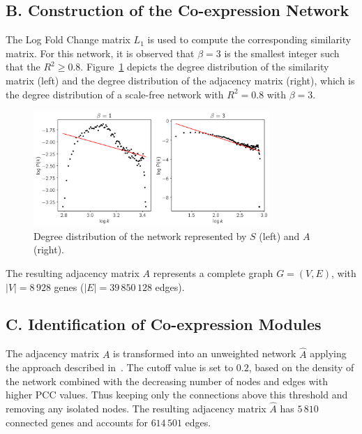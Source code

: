 \subsection*{B. Construction of the Co-expression Network}

The Log Fold Change matrix $L_1$ is used to compute the corresponding
similarity matrix.  For this network, it is observed that $\beta=3$ is
the smallest integer such that the $R^2 \geq 0.8
$. Figure~\ref{fig:beta} depicts the degree distribution of the
similarity matrix (left) and the degree distribution of the adjacency
matrix (right), which is the degree distribution of a scale-free
network with $R^2 = 0.8$ with $\beta = 3$.
\vspace{0.5cm}

\begin{figure}[htbp]
  \centering
    \includegraphics[clip,width=0.8\textwidth]{figures/figure2.png}
  \caption{Degree distribution of the network represented by $S$ (left) and $A$ (right).}
  \label{fig:beta}
\end{figure}

The resulting adjacency matrix $A$ represents a complete graph
$G=(V,E)$, with $|V| = 8\,928$ genes ($|E| = 39\,850\,128$ edges).

\subsection*{C. Identification of Co-expression Modules}

The adjacency matrix $A$ is transformed into an unweighted network
$\hat{A}$ applying the approach described
in~\cite{aoki2007approaches}. The cutoff value is set to $0.2$, 
based on the density of the network
combined with the decreasing number of nodes and edges with higher PCC
values. Thus keeping only the
connections above this threshold and removing any isolated nodes. The
resulting adjacency matrix $\hat{A}$ has $5\,810$ connected genes and
accounts for $614\,501$ edges.
\vspace{0.5cm}

